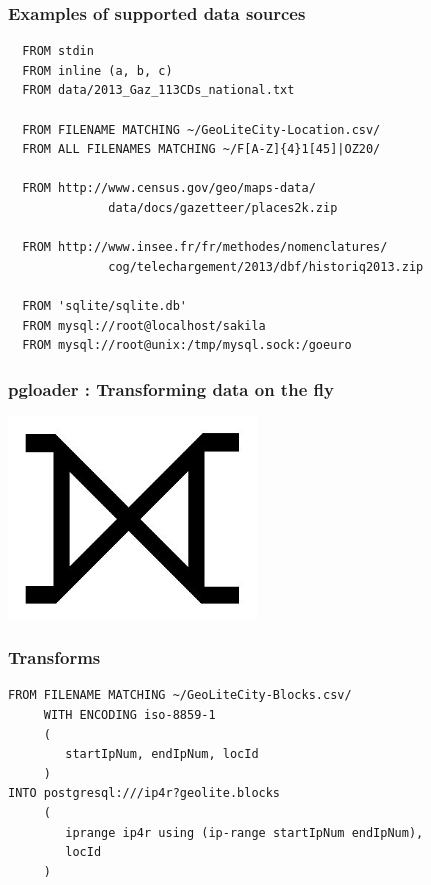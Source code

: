 \documentclass{beamer}
\begin{document}
\begin{frame}[fragile]
  \frametitle{Examples of supported data sources}

  \begin{verbatim}
  FROM stdin
  FROM inline (a, b, c)
  FROM data/2013_Gaz_113CDs_national.txt
  
  FROM FILENAME MATCHING ~/GeoLiteCity-Location.csv/
  FROM ALL FILENAMES MATCHING ~/F[A-Z]{4}1[45]|OZ20/
  
  FROM http://www.census.gov/geo/maps-data/
              data/docs/gazetteer/places2k.zip
  
  FROM http://www.insee.fr/fr/methodes/nomenclatures/
              cog/telechargement/2013/dbf/historiq2013.zip

  FROM 'sqlite/sqlite.db'              
  FROM mysql://root@localhost/sakila
  FROM mysql://root@unix:/tmp/mysql.sock:/goeuro

\end{verbatim}
\end{frame}

\begin{frame}
  \frametitle{pgloader : Transforming data on the fly}


  \begin{center}
    \includegraphics[height=2.1in]{huge-full-outer-join.jpg}
  \end{center}
\end{frame}

\begin{frame}[fragile]
  \frametitle{Transforms}

  \begin{verbatim}
FROM FILENAME MATCHING ~/GeoLiteCity-Blocks.csv/
     WITH ENCODING iso-8859-1
     (
        startIpNum, endIpNum, locId
     )
INTO postgresql:///ip4r?geolite.blocks
     (
        iprange ip4r using (ip-range startIpNum endIpNum),
        locId
     )
  \end{verbatim}
\end{frame}
\end{document}
